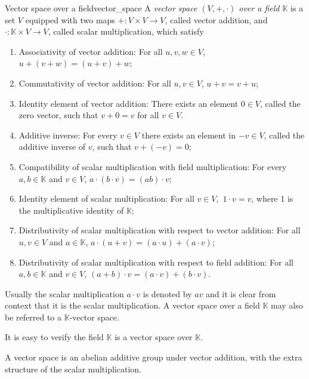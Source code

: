 \begin{definition}{Vector space over a field}{vector_space}
    A \emph{vector space \((V, +, \cdot)\) over a field \(\mathbb{K}\)} is a set \(V\) equipped with two maps \(+: V \times V \to V\), called vector addition, and \(\cdot : \mathbb{K} \times V \to V\), called scalar multiplication, which satisfy
    \begin{enumerate}[label=(\alph*)]
        \item Associativity of vector addition: For all \(u,v,w \in V\), \(u + (v + w) = (u + v) + w\);
        \item Commutativity of vector addition: For all \(u,v \in V\), \(u + v = v + u\);
        \item Identity element of vector addition: There exists an element \(0 \in V\), called the zero vector, such that \(v + 0 = v\) for all \(v \in V\).
        \item Additive inverse: For every \(v \in V\) there exists an element in \(-v \in V\), called the additive inverse of \(v\), such that \(v + (-v) = 0\);
        \item Compatibility of scalar multiplication with field multiplication: For every \(a,b\in \mathbb{K}\) and \(v \in V\), \(a\cdot(b\cdot v) = (ab) \cdot v\);
        \item Identity element of scalar multiplication: For all \(v \in V,\) \(1\cdot v = v\), where 1 is the multiplicative identity of \(\mathbb{K}\);
        \item Distributivity of scalar multiplication with respect to vector addition: For all \(u, v \in V\) and  \(a\in \mathbb{K}\), \(a\cdot (u+v) = (a\cdot u) + (a\cdot v)\);
        \item Distributivity of scalar multiplication with respect to field addition: For all \(a,b \in \mathbb{K}\) and  \(v\in V\), \((a+b)\cdot v = (a\cdot v) + (b\cdot v)\).
    \end{enumerate}
    Usually the scalar multiplication \(a \cdot v\) is denoted by \(av\) and it is clear from context that it is the scalar multiplication. A vector space over a field \(\mathbb{K}\) may also be referred to a \(\mathbb{K}\)-vector space.
\end{definition}
\begin{remark}
    It is easy to verify the field \(\mathbb{K}\) is a vector space over \(\mathbb{K}\).
\end{remark}
\begin{remark}
    A vector space is an abelian additive group under vector addition, with the extra structure of the scalar multiplication.
\end{remark}


